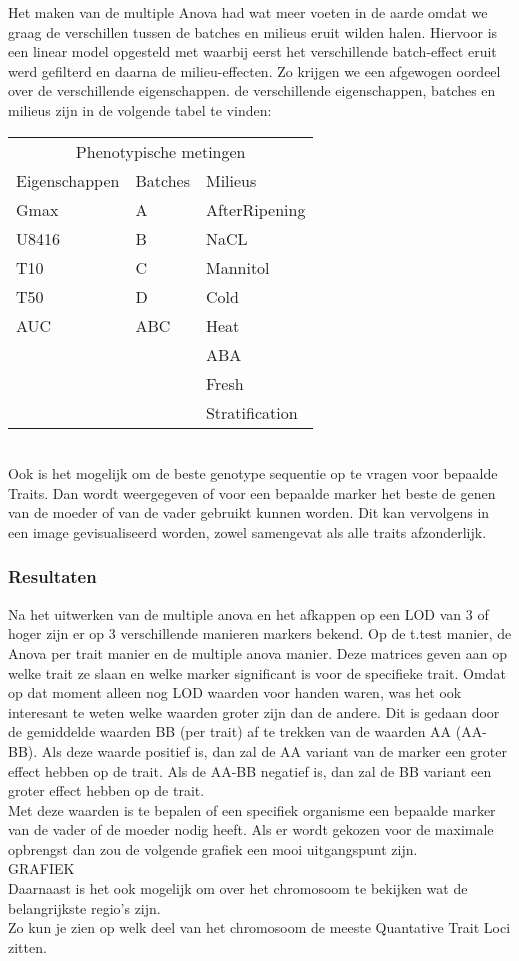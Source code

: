 \documentclass[12pt,a4paper, twocolumn]{article}
\begin{document}
Het maken van de multiple Anova had wat meer voeten in de aarde omdat we graag de verschillen tussen de batches en milieus eruit wilden halen.
Hiervoor is een linear model opgesteld met waarbij eerst het verschillende batch-effect eruit werd gefilterd en daarna de milieu-effecten.
Zo krijgen we een afgewogen oordeel over de verschillende eigenschappen.
de verschillende eigenschappen, batches en milieus zijn in de volgende tabel te vinden:\\

\begin{tabular} {l  l  l}
\multicolumn{3}{c}{Phenotypische metingen} \\
Eigenschappen & Batches & Milieus\\ 
\hline 
Gmax & A & AfterRipening\\
U8416 & B & NaCL\\
T10 & C & Mannitol\\
T50 & D & Cold\\
AUC & ABC & Heat\\
 &  & ABA\\
 &  & Fresh\\
 &  & Stratification\\
\end{tabular}\\


Ook is het mogelijk om de beste genotype sequentie op te vragen voor bepaalde Traits.
Dan wordt weergegeven of voor een bepaalde marker het beste de genen van de moeder of van de vader gebruikt kunnen worden.
Dit kan vervolgens  in een image gevisualiseerd worden, zowel samengevat als alle traits afzonderlijk.


\subsubsection*{Resultaten}
Na het uitwerken van de multiple anova en het afkappen op een LOD van 3 of hoger zijn er op 3 verschillende manieren markers bekend. 
Op de t.test manier, de Anova per trait manier en de multiple anova manier. 
Deze matrices geven aan op welke trait ze slaan en welke marker significant is voor de specifieke trait.
Omdat  op dat moment alleen nog LOD waarden voor handen waren, was het ook interesant te weten welke waarden groter zijn dan de andere. 
Dit is gedaan door de gemiddelde waarden BB (per trait) af te trekken van de waarden AA (AA-BB).
Als deze waarde positief is, dan zal de AA variant van de marker een groter effect hebben op de trait. 
Als de AA-BB negatief is, dan zal de BB variant een groter effect hebben op de trait. \\
Met deze waarden is te bepalen of een specifiek organisme een bepaalde marker van de vader of de moeder nodig heeft.
Als er wordt gekozen voor de maximale opbrengst dan zou de volgende grafiek een mooi uitgangspunt zijn.\\
GRAFIEK\\
Daarnaast is het ook mogelijk om over het chromosoom te bekijken wat de belangrijkste regio's zijn.\\
Zo kun je zien op welk deel van het chromosoom de meeste Quantative Trait Loci zitten.
\end{document}
